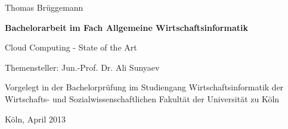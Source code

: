\vspace*{1mm}

\thispagestyle{empty}
Thomas Brüggemann

\vspace*{23mm}

\begin{center}
\textbf{
    Bachelorarbeit
\linebreak
    im Fach Allgemeine Wirtschaftsinformatik}
\end{center}

\vspace*{20mm}

\begin{center}
\LARGE 
    Cloud Computing - State of the Art
\end{center}

\vspace*{8mm}

\begin{center}
    Themensteller: Jun.-Prof. Dr. Ali Sunyaev
\end{center}

\vspace*{12mm}

\begin{center}
    Vorgelegt in der Bachelorprüfung
\linebreak
    im Studiengang Wirtschaftsinformatik
\linebreak
    der Wirtschafts- und Sozialwissenschaftlichen Fakultät
\linebreak
    der Universität zu Köln
\end{center}

\vspace*{30mm}

\begin{center}
Köln, April 2013
\end{center}


